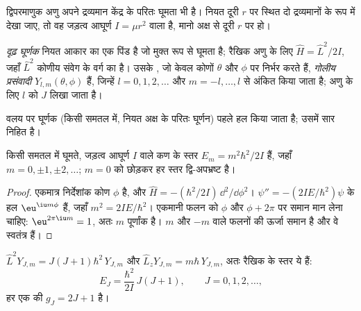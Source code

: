 द्विपरमाणुक अणु अपने द्रव्यमान केंद्र के परितः घूमता भी है। नियत दूरी $r$ पर
स्थित दो द्रव्यमानों के रूप में देखा जाए, तो वह जड़त्व आघूर्ण
$I = \mu r^2$ वाला  है, मानो  अक्ष से दूरी $r$ पर हो।

\begin{definition}[दृढ़ घूर्णक, गोलीय प्रसंवादी]\label{def:b3:quantum-model-systems:rotor}
\emph{दृढ़ घूर्णक} नियत आकार का एक पिंड है जो मुक्त रूप से
घूमता है; रैखिक अणु के लिए $\hat H = \hat L^2/2I$, जहाँ $\hat L^2$
कोणीय संवेग के वर्ग का  है। उसके , जो केवल कोणों
$\theta$ और $\phi$ पर निर्भर करते हैं, \emph{गोलीय
प्रसंवादी} $Y_{l,m}(\theta,\phi)$ हैं, जिन्हें $l =
0, 1, 2, \dots$ और $m = -l, \dots, l$ से अंकित किया जाता है; अणु के लिए $l$ को $J$ लिखा जाता है।
\end{definition}

वलय पर घूर्णक (किसी समतल में, नियत अक्ष के परितः घूर्णन) पहले हल किया जाता है;
उसमें सार निहित है।

\begin{theorem}[वलय]\label{thm:b3:quantum-model-systems:ring}
किसी समतल में घूमते, जड़त्व आघूर्ण $I$ वाले कण के स्तर
$E_m = m^2\hbar^2/2I$ हैं, जहाँ $m = 0, \pm1, \pm2, \dots$; $m = 0$ को छोड़कर
हर स्तर द्वि-अपभ्रष्ट है।
\end{theorem}

\begin{proof}
एकमात्र निर्देशांक कोण $\phi$ है, और $\hat H = -(\hbar^2/2I)\,
\dd^2/\dd\phi^2$। $\psi'' = -(2IE/\hbar^2)\psi$ के हल $\eu^{\iu
m\phi}$ हैं, जहाँ $m^2 = 2IE/\hbar^2$। एकमानी फलन को
$\phi$ और $\phi + 2\pi$ पर समान मान लेना चाहिए: $\eu^{2\pi\iu m} = 1$, अतः $m$ पूर्णांक है।
$m$ और $-m$ वाले फलनों की ऊर्जा समान है और वे स्वतंत्र हैं।
\end{proof}

\begin{theorem}[दृढ़ घूर्णक के स्तर]\label{thm:b3:quantum-model-systems:rotor}
$\hat L^2Y_{J,m} = J(J+1)\hbar^2\,Y_{J,m}$ और $\hat L_zY_{J,m} = m\hbar\,
Y_{J,m}$, अतः रैखिक  के स्तर ये हैं:
\[
E_J = \frac{\hbar^2}{2I}\,J(J+1), \qquad J = 0, 1, 2, \dots,
\]
हर एक की  $g_J = 2J + 1$ है।
\end{theorem}
\admitted

